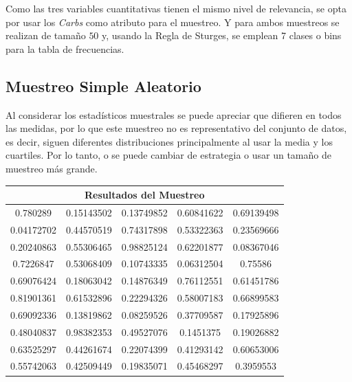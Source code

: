 \documentclass[12pt,a4paper]{article}
\begin{document}
    {
        Como las tres variables cuantitativas tienen el mismo nivel 
        de relevancia, se opta por usar los \emph{Carbs} como atributo 
        para el muestreo. Y para ambos muestreos se realizan de 
        tamaño $50$ y, usando la Regla de Sturges, se emplean 7 clases 
        o bins para la tabla de frecuencias.

        \subsection{Muestreo Simple Aleatorio}\label{subsec:sample_rand}
        {
            Al considerar los estadísticos muestrales se puede 
            apreciar que difieren en todos las medidas, por lo que este muestreo 
            no es representativo del conjunto de datos, es decir, siguen diferentes 
            distribuciones principalmente al usar la media y los cuartiles. Por lo 
            tanto, o se puede cambiar de estrategia o usar un tamaño de muestreo 
            más grande.

            \begin{center}
                \begin{tabular}{ccccc}
                        \multicolumn{5}{c}{Resultados del Muestreo} \\ 
                    \midrule
                        0.780289 &   0.15143502 & 0.13749852 &  0.60841622 & 0.69139498 \\ 
                        0.04172702 & 0.44570519 & 0.74317898 & 0.53322363 & 0.23569666\\
                        0.20240863 & 0.55306465 & 0.98825124 &  0.62201877 & 0.08367046 \\ 
                        0.7226847 & 0.53068409 & 0.10743335 & 0.06312504 & 0.75586 \\
                        0.69076424 & 0.18063042 & 0.14876349 &  0.76112551 & 0.61451786 \\ 
                        0.81901361 & 0.61532896 & 0.22294326 & 0.58007183 & 0.66899583\\
                        0.69092336 & 0.13819862 & 0.08259526 &  0.37709587 & 0.17925896 \\ 
                        0.48040837 & 0.98382353 & 0.49527076 & 0.1451375 &  0.19026882\\
                        0.63525297 & 0.44261674 & 0.22074399 &  0.41293142 & 0.60653006 \\ 
                        0.55742063 & 0.42509449 & 0.19835071 & 0.45468297 & 0.3959553\\
                \end{tabular}
            \end{center}

}}
\end{document}
